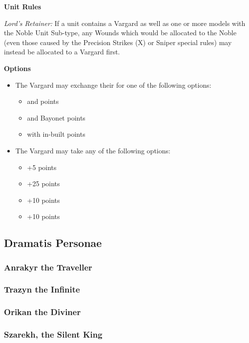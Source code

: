 \begin{minipage}[t]{0.72\textwidth}
	\vspace*{2em}
	\textbf{Unit Rules}
	
	\textit{Lord's Retainer:} If a unit contains a Vargard as well as one or more models with the Noble Unit Sub-type, any Wounds which would be allocated to the Noble (even those caused by the Precision Strikes (X) or Sniper special rules) may instead	be allocated to a Vargard first.

	\vspace*{2em}
	\textbf{Options}
	\begin{itemize}
		\item The Vargard may exchange their  for one of the following options:
		\begin{itemize}			
			\item {} and   points
			\item {} and Bayonet  points
			\item {} with in-built   points
		\end{itemize}
		\item The Vargard may take any of the following options:
		\begin{itemize}
			\item {} \dotfill +5 points
			\item {} \dotfill +25 points
			\item {} \dotfill +10 points
			\item {} \dotfill +10 points
		\end{itemize}
	\end{itemize}
\end{minipage}
\hspace{0.5em}


\newpage
\subsection{Dramatis Personae}

\subsubsection{Anrakyr the Traveller}

\newpage
\subsubsection{Trazyn the Infinite}

\newpage
\subsubsection{Orikan the Diviner}

\newpage
\subsubsection{Szarekh, the Silent King}